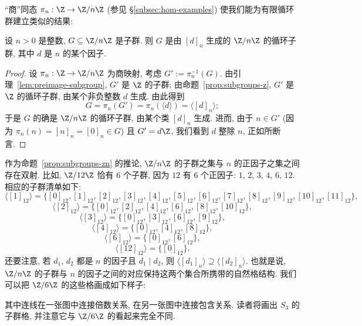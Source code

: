 ``商''同态 $\pi_n : \Z \to \Z/n\Z$ (参见 \S\ref{subsec:hom-examples}) 使我们能为有限循环群建立类似的结果:

\begin{proposition}
\label{prop:subgroups-zn}
设 $n > 0$ 是整数, $G \subseteq \Z/n\Z$ 是子群. 则 $G$ 是由 $[d]_n$ 生成的 $\Z/n\Z$ 的循环子群, 其中 $d$ 是 $n$ 的某个因子.
\end{proposition}

\begin{proof}
设 $\pi_n : \Z \to \Z/n\Z$ 为商映射, 考虑 $G' := \pi_n^{-1}(G)$. 由引理~\ref{lem:preimage-subgroup}, $G'$ 是 $\Z$ 的子群; 由命题~\ref{prop:subgroups-z}, $G'$ 是 $\Z$ 的循环子群, 由某个非负整数 $d$ 生成. 由此得到
\[
G = \pi_n(G') = \pi_n(\langle d \rangle) = \langle [d]_n \rangle;
\]
于是 $G$ 的确是 $\Z/n\Z$ 的循环子群, 由某个类 $[d]_n$ 生成. 进而, 由于 $n \in G'$ (因为 $\pi_n(n) = [n]_n = [0]_n \in G$) 且 $G' = d\Z$, 我们看到 $d$ 整除 $n$, 正如所断言.
\end{proof}

作为命题~\ref{prop:subgroups-zn} 的推论, $\Z/n\Z$ 的子群之集与 $n$ 的正因子之集之间存在双射. 比如, $\Z/12\Z$ 恰有 $6$ 个子群, 因为 $12$ 有 $6$ 个正因子: $1$, $2$, $3$, $4$, $6$, $12$. 相应的子群清单如下:
\[
\langle [1]_{12} \rangle = \{[0]_{12}, [1]_{12}, [2]_{12}, [3]_{12}, [4]_{12}, [5]_{12}, [6]_{12}, [7]_{12}, [8]_{12}, [9]_{12}, [10]_{12}, [11]_{12}\},
\]
\[
\langle [2]_{12} \rangle = \{[0]_{12}, [2]_{12}, [4]_{12}, [6]_{12}, [8]_{12}, [10]_{12}\},
\]
\[
\langle [3]_{12} \rangle = \{[0]_{12}, [3]_{12}, [6]_{12}, [9]_{12}\},
\]
\[
\langle [4]_{12} \rangle = \{[0]_{12}, [4]_{12}, [8]_{12}\},
\]
\[
\langle [6]_{12} \rangle = \{[0]_{12}, [6]_{12}\},
\]
\[
\langle [12]_{12} \rangle = \{[0]_{12}\}.
\]
还要注意, 若 $d_1$, $d_2$ 都是 $n$ 的因子且 $d_1 \mid d_2$, 则 $\langle[d_1]_n\rangle \supseteq \langle[d_2]_n\rangle$. 也就是说, $\Z/n\Z$ 的子群与 $n$ 的因子之间的对应保持这两个集合所携带的自然格结构. 我们可以把 $\Z/6\Z$ 的这些格画成如下样子:
\begin{center}
\qquad
{}
\end{center}
其中连线在一张图中连接倍数关系, 在另一张图中连接包含关系. 读者将画出 $S_3$ 的子群格, 并注意它与 $\Z/6\Z$ 的看起来完全不同.

